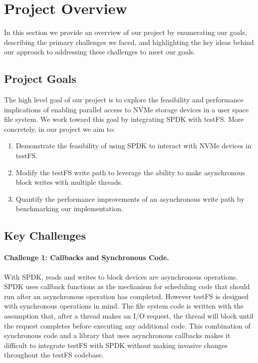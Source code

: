 \section{Project Overview}
In this section we provide an overview of our project by enumerating our goals,
describing the primary challenges we faced, and highlighting the key ideas
behind our approach to addressing these challenges to meet our goals.

\subsection{Project Goals}
The high level goal of our project is to explore the feasibility and
performance implications of enabling parallel access to NVMe storage devices in
a user space file system. We work toward this goal by integrating SPDK with
testFS. More concretely, in our project we aim to:

\begin{enumerate}
  \item Demonstrate the feasibility of using SPDK to interact with NVMe devices
    in testFS.
  \item Modify the testFS write path to leverage the ability to make
    asynchronous block writes with multiple threads.
  \item Quantify the performance improvements of an asynchronous write path by
    benchmarking our implementation.
\end{enumerate}

\vspace{-1em}
\subsection{Key Challenges}

\paragraph{Challenge 1: Callbacks and Synchronous Code.}
With SPDK, reads and writes to block devices are asynchronous operations. SPDK
uses callback functions as the mechanism for scheduling code that should run
after an asynchronous operation has completed. However testFS is designed with
synchronous operations in mind. The file system code is written with the
assumption that, after a thread makes an I/O request, the thread will block
until the request completes before executing any additional code. This
combination of synchronous code and a library that uses asynchronous callbacks
makes it difficult to integrate testFS with SPDK without making invasive
changes throughout the testFS codebase.


